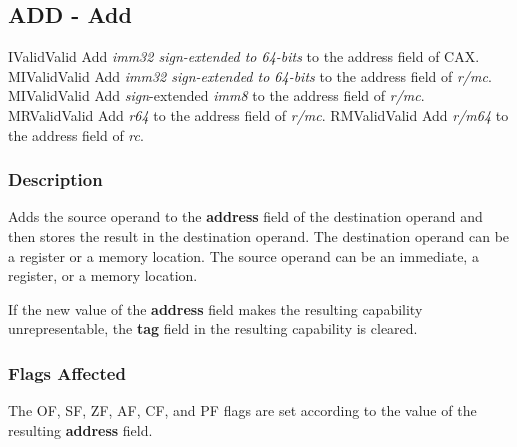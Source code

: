 \clearpage
{}
{}
\subsection*{ADD - Add}

\begin{x86opcodetable}
  {I}{Valid}{Valid}
  {Add \emph{imm32 sign-extended to 64-bits} to the address field of
    CAX.}
  {MI}{Valid}{Valid}
  {Add \emph{imm32 sign-extended to 64-bits} to the address field of
    \emph{r/mc}.}
  {MI}{Valid}{Valid}
  {Add \emph{sign}-extended \emph{imm8} to the address field of
    \emph{r/mc}.}
  {MR}{Valid}{Valid}
  {Add \emph{r64} to the address field of \emph{r/mc}.}
  {RM}{Valid}{Valid}
  {Add \emph{r/m64} to the address field of \emph{rc}.}
\end{x86opcodetable}

\begin{x86opentable}
\end{x86opentable}

\subsubsection*{Description}

Adds the source operand to the \textbf{address} field of the
destination operand and then stores the result in the destination
operand. The destination operand can be a register or a memory
location. The source operand can be an immediate, a register, or a
memory location.

If the new value of the \textbf{address} field makes the resulting
capability unrepresentable, the \textbf{tag} field in the resulting
capability is cleared.

\subsubsection*{Flags Affected}

The OF, SF, ZF, AF, CF, and PF flags are set according to the value of
the resulting \textbf{address} field.
